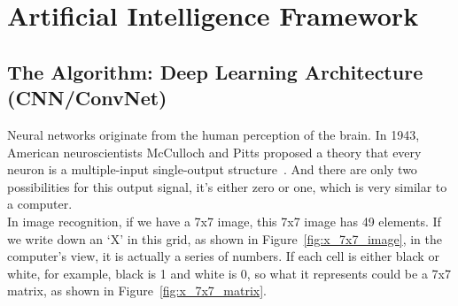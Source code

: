 \label{chap:3}
\section{Artificial Intelligence Framework}
\label{sec:3.1}
\subsection{The Algorithm: Deep Learning Architecture (CNN/ConvNet)}

Neural networks originate from the human perception of the brain. In 1943, American neuroscientists McCulloch and Pitts proposed a theory that every neuron is a multiple-input single-output structure~\cite{mcculloch1943logical}. And there are only two possibilities for this output signal, it's either zero or one, which is very similar to a computer.\\

In image recognition, if we have a 7x7 image, this 7x7 image has 49 elements. If we write down an `X' in this grid, as shown in Figure~\ref{fig:x_7x7_image}, in the computer's view, it is actually a series of numbers. If each cell is either black or white, for example, black is 1 and white is 0, so what it represents could be a 7x7 matrix, as shown in Figure~\ref{fig:x_7x7_matrix}.\\


